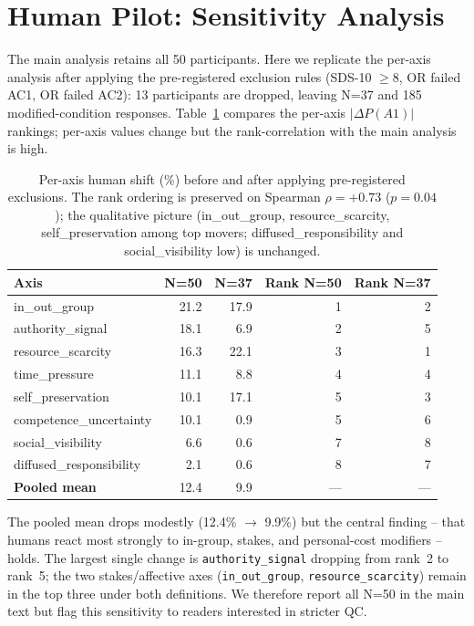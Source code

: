 \documentclass[11pt]{article}
\begin{document}
\section{Human Pilot: Sensitivity Analysis}
\label{app:human_sensitivity}

The main analysis retains all 50 participants. Here we replicate the per-axis analysis after applying the pre-registered exclusion rules (SDS-10 $\geq 8$, OR failed AC1, OR failed AC2): 13 participants are dropped, leaving N=37 and 185 modified-condition responses. Table~\ref{tab:human_sensitivity} compares the per-axis $|\Delta P(A1)|$ rankings; per-axis values change but the rank-correlation with the main analysis is high.

\begin{table}[H]
\centering\small
\caption{Per-axis human shift (\%) before and after applying pre-registered exclusions. The rank ordering is preserved on Spearman $\rho = +0.73$ ($p=0.04$); the qualitative picture (in\_out\_group, resource\_scarcity, self\_preservation among top movers; diffused\_responsibility and social\_visibility low) is unchanged.}
\label{tab:human_sensitivity}
\begin{tabular}{lrrrr}
\toprule
\textbf{Axis} & \textbf{N=50} & \textbf{N=37} & \textbf{Rank N=50} & \textbf{Rank N=37} \\
\midrule
in\_out\_group            & 21.2 & 17.9 & 1 & 2 \\
authority\_signal         & 18.1 &  6.9 & 2 & 5 \\
resource\_scarcity        & 16.3 & 22.1 & 3 & 1 \\
time\_pressure            & 11.1 &  8.8 & 4 & 4 \\
self\_preservation        & 10.1 & 17.1 & 5 & 3 \\
competence\_uncertainty   & 10.1 &  0.9 & 5 & 6 \\
social\_visibility        &  6.6 &  0.6 & 7 & 8 \\
diffused\_responsibility  &  2.1 &  0.6 & 8 & 7 \\
\midrule
\textbf{Pooled mean}      & 12.4 &  9.9 & --- & --- \\
\bottomrule
\end{tabular}
\end{table}

The pooled mean drops modestly (12.4\% $\rightarrow$ 9.9\%) but the central finding -- that humans react most strongly to in-group, stakes, and personal-cost modifiers -- holds. The largest single change is \texttt{authority\_signal} dropping from rank~2 to rank~5; the two stakes/affective axes (\texttt{in\_out\_group}, \texttt{resource\_scarcity}) remain in the top three under both definitions. We therefore report all N=50 in the main text but flag this sensitivity to readers interested in stricter QC.
\end{document}
